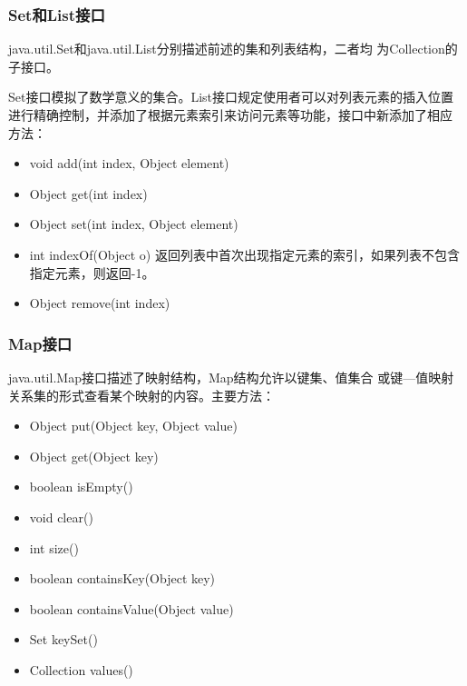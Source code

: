 \begin{frame}[fragile] %
  \frametitle{Set和List接口}

  java.util.Set和java.util.List分别描述前述的集和列表结构，二者均
  为Collection的子接口。

  \pause
  
  {\kai Set接口模拟了数学意义的集合。List接口规定使用者可以对列表元素的插入位置
    进行精确控制，并添加了根据元素索引来访问元素等功能，接口中新添加了相应
    方法：}

  \begin{itemize}[<+-| alert@+>]\kai
  \item void add(int index, Object element)
  \item Object get(int index)
  \item Object set(int index, Object element) 
  \item int indexOf(Object o) 返回列表中首次出现指定元素的索引，如果列表不包含指定元素，则返回-1。
  \item Object remove(int index)
  \end{itemize}
\end{frame}

\begin{frame}[fragile] %
  \frametitle{Map接口}

  java.util.Map接口描述了映射结构，Map结构允许以{\hei\Blue 键集、值集合
    或键—值映射关系集}的形式查看某个映射的内容。主要方法：
  
  \begin{itemize}[<+-| alert@+>]\kai
  \item Object put(Object key, Object value)\\
  \item Object get(Object key)\\
  \item boolean isEmpty()
  \item void clear()
  \item int size()
  \item boolean containsKey(Object key)\\
  \item boolean containsValue(Object value)
  \item Set keySet()\\
  \item Collection values()\\
  \end{itemize}
\end{frame}

